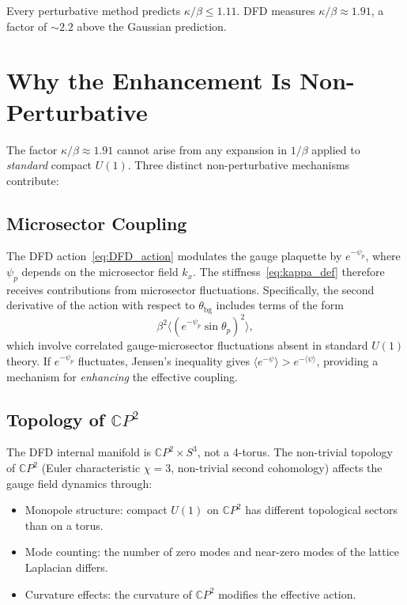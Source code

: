 \documentclass[11pt]{article}
\begin{document}
\noindent Every perturbative method predicts $\kappa/\beta \leq 1.11$.
DFD measures $\kappa/\beta \approx 1.91$, a factor of $\sim\!2.2$ above
the Gaussian prediction.


\section{Why the Enhancement Is Non-Perturbative}

The factor $\kappa/\beta \approx 1.91$ cannot arise from any expansion
in $1/\beta$ applied to \emph{standard} compact $U(1)$.  Three distinct
non-perturbative mechanisms contribute:

\subsection{Microsector Coupling}

The DFD action~\eqref{eq:DFD_action} modulates the gauge plaquette
by $e^{-\psi_p}$, where $\psi_p$ depends on the microsector field $k_x$.
The stiffness~\eqref{eq:kappa_def} therefore receives contributions from
microsector fluctuations.  Specifically, the second derivative of the
action with respect to $\theta_{\mathrm{bg}}$ includes terms of the form
\[
  \beta^2 \bigl\langle (e^{-\psi_p}\sin\theta_p)^2 \bigr\rangle,
\]
which involve correlated gauge-microsector fluctuations absent in
standard $U(1)$ theory.  If $e^{-\psi_p}$ fluctuates, Jensen's inequality
gives $\langle e^{-\psi}\rangle > e^{-\langle\psi\rangle}$, providing
a mechanism for \emph{enhancing} the effective coupling.

\subsection{Topology of $\mathbb{C}P^2$}

The DFD internal manifold is $\mathbb{C}P^2 \times S^3$, not a 4-torus.
The non-trivial topology of $\mathbb{C}P^2$ (Euler characteristic
$\chi = 3$, non-trivial second cohomology) affects the gauge field
dynamics through:
\begin{itemize}
  \item Monopole structure: compact $U(1)$ on $\mathbb{C}P^2$ has different
        topological sectors than on a torus.
  \item Mode counting: the number of zero modes and near-zero modes
        of the lattice Laplacian differs.
  \item Curvature effects: the curvature of $\mathbb{C}P^2$ modifies
        the effective action.
\end{itemize}
\end{document}
